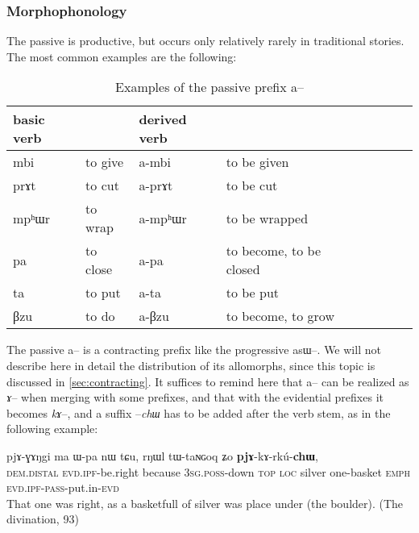 \documentclass[oldfontcommands,oneside,a4paper,11pt]{memoir}
\newcommand{\ipa}[1]{{\phon #1}} %
\newcommand{\dem}{\textsc{dem}}
\newcommand{\emphat}{\textsc{emph}}
\newcommand{\evd}{\textsc{evd}}
\newcommand{\ipf}{\textsc{ipf}}
\newcommand{\loc}{\textsc{loc}}
\newcommand{\pass}{\textsc{pass}}
\newcommand{\poss}{\textsc{poss}}
\newcommand{\sg}{\textsc{sg}}
\newcommand{\topic}{\textsc{top}}
\begin{document}
\subsubsection{Morphophonology} \label{subsub:passive.morph}
The passive is productive, but occurs only relatively rarely in traditional stories. The most common examples are the following:
\begin{table}[H]
\caption{Examples of the passive prefix \ipa{a}--}\label{tab:passive} \centering
\begin{tabular}{lllllllll} \toprule
basic verb  & &derived  verb &\\
\midrule
\ipa{mbi}   &	to give&  	\ipa{a-mbi}   &	 to be given \\  
\ipa{prɤt}   &	to cut &  	\ipa{a-prɤt}   &	 to be cut \\   
\ipa{mpʰɯr}   &	to wrap &  	\ipa{a-mpʰɯr}   &	 to be wrapped\\  
\ipa{pa}   &	to close &  	\ipa{a-pa}   &	 to become, to be closed \\  
\ipa{ta}   &	to put &  	\ipa{a-ta}   &	 to be put \\  
\ipa{βzu}   &	to do   &  	\ipa{a-βzu}   &	 to become, to grow \\  
\bottomrule
\end{tabular}
\end{table}


The passive \ipa{a}-- is a contracting prefix  like the progressive \ipa{asɯ}--. We will not describe here   in detail the distribution of its allomorphs, since this topic is discussed in \ref{sec:contracting}. It suffices to remind here that \ipa{a}-- can be realized as \textit{ɤ}-- when merging with some prefixes, and that with the evidential prefixes it becomes \textit{kɤ}--, and a suffix --\textit{chɯ} has to be added after the verb stem, as in the following example:
\begin{exe}
\ex
\gll  \ipa{nɯnɯ} 	\ipa{pjɤ-ɣɤŋgi} 	\ipa{ma} 	\ipa{ɯ-pa} 	\ipa{nɯ} 	\ipa{tɕu,} 	\ipa{rŋɯl} 	\ipa{tɯ-taɴɢoq} 	\ipa{ʑo} 	\ipa{\textbf{pjɤ}-kɤ-rkú-\textbf{chɯ},}   \\
\dem{}.\textsc{distal} \evd{}.\ipf{}-be.right because 3\sg{}.\poss{}-down \topic{} \loc{} silver one-basket \emphat{} \evd{}.\ipf{}-\pass{}-put.in-\evd{} \\
 \glt  That one was right, as a basketfull of silver was place under (the boulder).  (The divination, 93)
\end{exe} 
 
\end{document}
